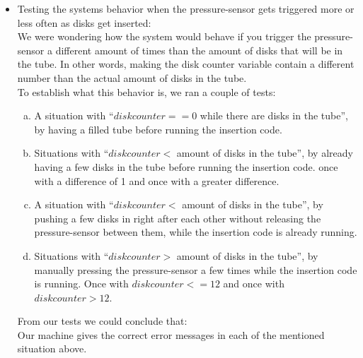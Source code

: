 \begin{itemize}
\item Testing the systems behavior when the pressure-sensor gets triggered more or less often as disks get inserted:\\
We were wondering how the system would behave if you trigger the pressure-sensor a different amount of times than the amount of disks that will be in the tube. In other words, making the disk counter variable contain a different number than the actual amount of disks in the tube.\\
To establish what this behavior is, we ran a couple of tests:
\begin{enumerate}[a.]
\item A situation with ``$disk counter == 0$ while there are disks in the tube'', by having a filled tube before running the insertion code.
\item Situations with ``$disk counter <$ amount of disks in the tube'', by already having a few disks in the tube before running the insertion code. once with a difference of 1 and once with a greater difference.
\item A situation with ``$disk counter <$ amount of disks in the tube'', by pushing a few disks in right after each other without releasing the pressure-sensor between them, while the insertion code is already running.
\item Situations with ``$disk counter >$ amount of disks in the tube'', by manually pressing the pressure-sensor a few times while the insertion code is running. Once with $disk counter <= 12$ and once with $disk counter > 12$.
\end{enumerate}
From our tests we could conclude that:\\
Our machine gives the correct error messages in each of the mentioned situation above.\\



\end{itemize}
